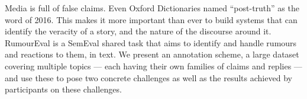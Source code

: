 Media is full of false claims. Even Oxford Dictionaries named ``post-truth'' as the word of 2016. This makes it more important than ever to build systems that can identify the veracity of a story, and the nature of the discourse around it. RumourEval is a SemEval shared task that aims to identify and handle rumours and reactions to them, in text. We present an annotation scheme, a large dataset covering multiple topics --- each having their own families of claims and replies --- and use these to pose two concrete challenges as well as the results achieved by participants on these challenges.
